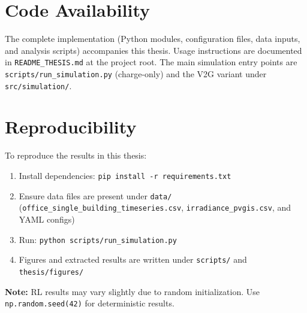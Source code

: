 \section{Code Availability}
\label{app:availability}

The complete implementation (Python modules, configuration files, data inputs, and analysis scripts) accompanies this thesis. Usage instructions are documented in \texttt{README\_THESIS.md} at the project root. The main simulation entry points are \texttt{scripts/run\_simulation.py} (charge-only) and the V2G variant under \texttt{src/simulation/}.

\section{Reproducibility}
\label{app:reproducibility}

To reproduce the results in this thesis:

\begin{enumerate}
    \item Install dependencies: \texttt{pip install -r requirements.txt}
    \item Ensure data files are present under \texttt{data/} (\texttt{office\_single\_building\_timeseries.csv}, \texttt{irradiance\_pvgis.csv}, and YAML configs)
    \item Run: \texttt{python scripts/run\_simulation.py}
    \item Figures and extracted results are written under \texttt{scripts/} and \texttt{thesis/figures/}
\end{enumerate}

\textbf{Note:} RL results may vary slightly due to random initialization. Use \texttt{np.random.seed(42)} for deterministic results.

